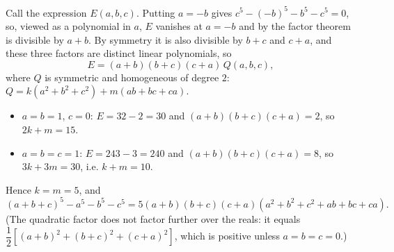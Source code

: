 Call the expression $E(a,b,c)$. Putting $a=-b$ gives $c^5-(-b)^5-b^5-c^5=0$, so, viewed as a polynomial in $a$, $E$ vanishes at $a=-b$ and by the factor theorem is divisible by $a+b$. By symmetry it is also divisible by $b+c$ and $c+a$, and these three factors are distinct linear polynomials, so
\[E=(a+b)(b+c)(c+a)\,Q(a,b,c),\]
where $Q$ is symmetric and homogeneous of degree $2$: $Q=k(a^2+b^2+c^2)+m(ab+bc+ca)$.
\begin{itemize}
\item $a=b=1$, $c=0$: $E=32-2=30$ and $(a+b)(b+c)(c+a)=2$, so $2k+m=15$.
\item $a=b=c=1$: $E=243-3=240$ and $(a+b)(b+c)(c+a)=8$, so $3k+3m=30$, i.e. $k+m=10$.
\end{itemize}
Hence $k=m=5$, and
\[(a+b+c)^5-a^5-b^5-c^5=\boxed{5(a+b)(b+c)(c+a)(a^2+b^2+c^2+ab+bc+ca)}.\]
(The quadratic factor does not factor further over the reals: it equals $\dfrac{1}{2}\left[(a+b)^2+(b+c)^2+(c+a)^2\right]$, which is positive unless $a=b=c=0$.)
